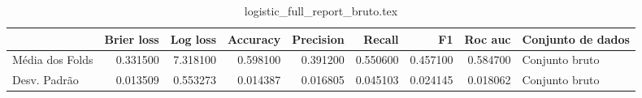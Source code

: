 \begin{table}
\centering
\caption{logistic_full_report_bruto.tex}
\label{logistic_full_report_bruto.tex}
\begin{tabular}{lrrrrrrrl}
\toprule
{} &  Brier  loss &  Log loss &  Accuracy  &  Precision  &   Recall  &       F1  &  Roc auc  & Conjunto de dados \\
\midrule
Média dos Folds &     0.331500 &  7.318100 &   0.598100 &    0.391200 &  0.550600 &  0.457100 &  0.584700 &    Conjunto bruto \\
Desv. Padrão    &     0.013509 &  0.553273 &   0.014387 &    0.016805 &  0.045103 &  0.024145 &  0.018062 &    Conjunto bruto \\
\bottomrule
\end{tabular}
\end{table}
